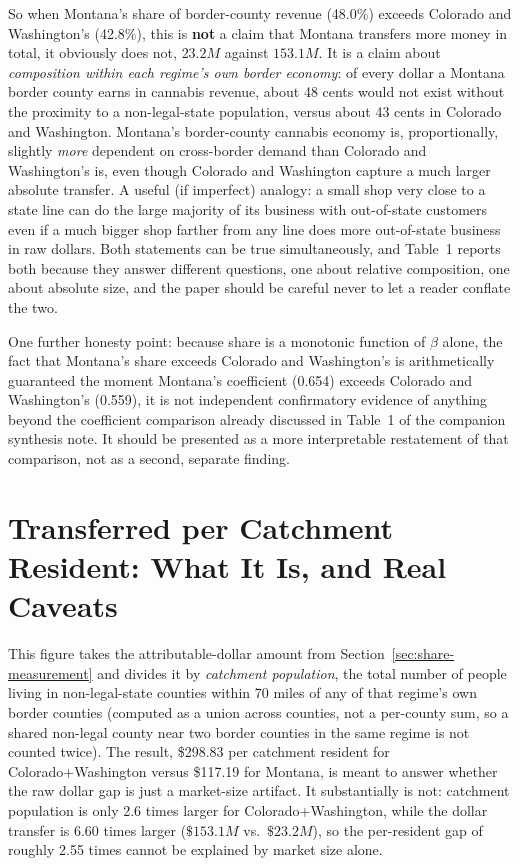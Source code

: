 \documentclass[11pt]{article}
\begin{document}
So when Montana's share of border-county revenue (48.0\%) exceeds Colorado and Washington's (42.8\%),
this is \textbf{not} a claim that Montana transfers more money in total, it obviously does not, $23.2M$
against $153.1M$. It is a claim about \emph{composition within each regime's own border economy}: of
every dollar a Montana border county earns in cannabis revenue, about 48 cents would not exist without the
proximity to a non-legal-state population, versus about 43 cents in Colorado and Washington. Montana's
border-county cannabis economy is, proportionally, slightly \emph{more} dependent on cross-border demand
than Colorado and Washington's is, even though Colorado and Washington capture a much larger absolute
transfer. A useful (if imperfect) analogy: a small shop very close to a state line can do the large
majority of its business with out-of-state customers even if a much bigger shop farther from any line
does more out-of-state business in raw dollars. Both statements can be true simultaneously, and Table~1
reports both because they answer different questions, one about relative composition, one about absolute
size, and the paper should be careful never to let a reader conflate the two.

One further honesty point: because share is a monotonic function of $\beta$ alone, the fact that
Montana's share exceeds Colorado and Washington's is arithmetically guaranteed the moment Montana's
coefficient (0.654) exceeds Colorado and Washington's (0.559), it is not independent confirmatory
evidence of anything beyond the coefficient comparison already discussed in Table~1 of the companion
synthesis note. It should be presented as a more interpretable restatement of that comparison, not as a
second, separate finding.

\section{Transferred per Catchment Resident: What It Is, and Real Caveats}
\label{sec:catchment-caveats}

This figure takes the attributable-dollar amount from Section~\ref{sec:share-measurement} and divides it
by \emph{catchment population}, the total number of people living in non-legal-state counties within 70
miles of any of that regime's own border counties (computed as a union across counties, not a per-county
sum, so a shared non-legal county near two border counties in the same regime is not counted twice). The
result, \$298.83 per catchment resident for Colorado+Washington versus \$117.19 for Montana, is meant to
answer whether the raw dollar gap is just a market-size artifact. It substantially is not: catchment
population is only 2.6 times larger for Colorado+Washington, while the dollar transfer is 6.60 times
larger ($\$153.1M$ vs.\ $\$23.2M$), so the per-resident gap of roughly 2.55 times cannot be explained by
market size alone.
\end{document}
